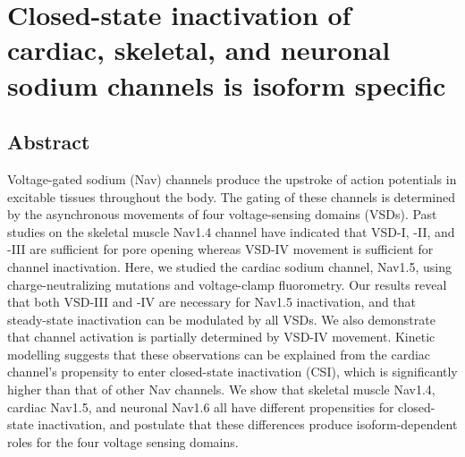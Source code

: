 \chapter{Closed-state inactivation of cardiac, skeletal, and neuronal sodium channels is isoform specific}
\label{sec:Nav}


\normalsize
\renewcommand{\thefigure}{A.\arabic{figure}}
\renewcommand{\figurename}{Fig.}
\setcounter{figure}{0}

\section{Abstract}
Voltage-gated sodium (Nav) channels produce the upstroke of action potentials in excitable tissues throughout the body. The gating of these channels is determined by the asynchronous movements of four voltage-sensing domains (VSDs). Past studies on the skeletal muscle Nav1.4 channel have indicated that VSD-I, -II, and -III are sufficient for pore opening whereas VSD-IV movement is sufficient for channel inactivation. Here, we studied the cardiac sodium channel, Nav1.5, using charge-neutralizing mutations and voltage-clamp fluorometry. Our results reveal that both VSD-III and -IV are necessary for Nav1.5 inactivation, and that steady-state inactivation can be modulated by all VSDs. We also demonstrate that channel activation is partially determined by VSD-IV movement. Kinetic modelling suggests that these observations can be explained from the cardiac channel’s propensity to enter closed-state inactivation (CSI), which is significantly higher than that of other Nav channels. We show that skeletal muscle Nav1.4, cardiac Nav1.5, and neuronal Nav1.6 all have different propensities for closed-state inactivation, and postulate that these differences produce isoform-dependent roles for the four voltage sensing domains.

